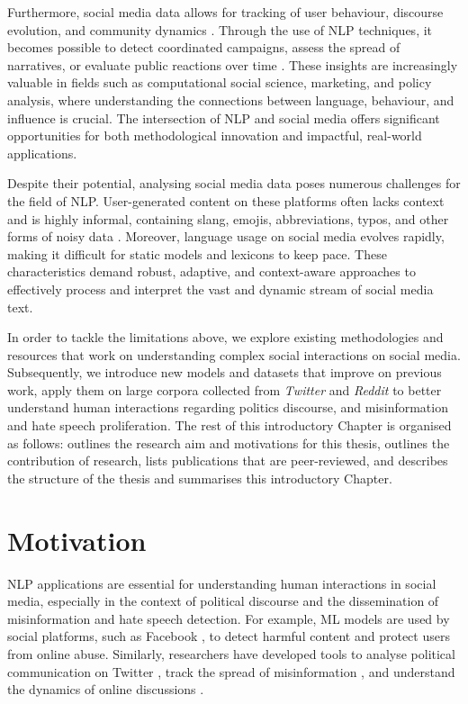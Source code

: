 Furthermore, social media data allows for tracking of user behaviour, discourse evolution, and community dynamics \cite{feuerriegel2025using, arazzi2023importance}. Through the use of \ac{NLP} techniques, it becomes possible to detect coordinated campaigns, assess the spread of narratives, or evaluate public reactions over time \cite{luceri2024leveraging}. These insights are increasingly valuable in fields such as computational social science, marketing, and policy analysis, where understanding the connections between language, behaviour, and influence is crucial. The intersection of \ac{NLP} and social media offers significant opportunities for both methodological innovation and impactful, real-world applications.

Despite their potential, analysing social media data poses numerous challenges for the field of \ac{NLP}. User-generated content on these platforms often lacks context and is highly informal, containing slang, emojis, abbreviations, typos, and other forms of noisy data \cite{eisenstein2013bad,gain-etal-2023-reference}. Moreover, language usage on social media evolves rapidly, making it difficult for static models and lexicons to keep pace. These characteristics demand robust, adaptive, and context-aware approaches to effectively process and interpret the vast and dynamic stream of social media text.

In order to tackle the limitations above, we explore existing methodologies and resources that work on understanding complex social interactions on social media. Subsequently, we introduce new models and datasets that improve on previous work, apply them on large corpora collected from \textit{Twitter} and \textit{Reddit} to better understand human interactions regarding politics discourse, and misinformation and hate speech proliferation. The rest of this introductory Chapter is organised as follows:  outlines the research aim and motivations for this thesis,   outlines the contribution of research,  lists publications that are peer-reviewed, and  describes the structure of the thesis and summarises this introductory Chapter.

\clearpage
\section{Motivation} \label{ch1:motivation}
\ac{NLP} applications are essential for understanding human interactions in social media, especially in the context of political discourse and the dissemination of misinformation and hate speech detection. For example, \ac{ML} models are used by social platforms, such as Facebook \cite{schroepfer2021update}, to detect harmful content and protect users from online abuse. Similarly, researchers have developed tools to analyse political communication on Twitter \cite{barbera2015birds}, track the spread of misinformation \cite{shu2017fake}, and understand the dynamics of online discussions \cite{zhang2018conversations}. 

